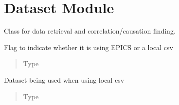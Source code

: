 \documentclass[letterpaper,10pt,english]{sphinxmanual}
\begin{document}
\chapter{Dataset Module}
\label{\detokenize{dataset:module-dataset}}\label{\detokenize{dataset:dataset-module}}\label{\detokenize{dataset::doc}}

\begin{fulllineitems}
\label{\detokenize{dataset:dataset.Dataset}}
\sphinxAtStartPar
Class for data retrieval and correlation/causation finding.

\begin{fulllineitems}
\label{\detokenize{dataset:dataset.Dataset.EPICS}}
\sphinxAtStartPar
Flag to indicate whether it is using EPICS or a local csv
\begin{quote}\begin{description}
\item[{Type}] \leavevmode
\sphinxAtStartPar
{}

\end{description}\end{quote}

\end{fulllineitems}


\begin{fulllineitems}
\label{\detokenize{dataset:dataset.Dataset.dataset}}
\sphinxAtStartPar
Dataset being used when using local csv
\begin{quote}\begin{description}
\item[{Type}] \leavevmode
\sphinxAtStartPar
{}


\end{description}
\end{quote}
\end{fulllineitems}
\end{fulllineitems}
\end{document}
